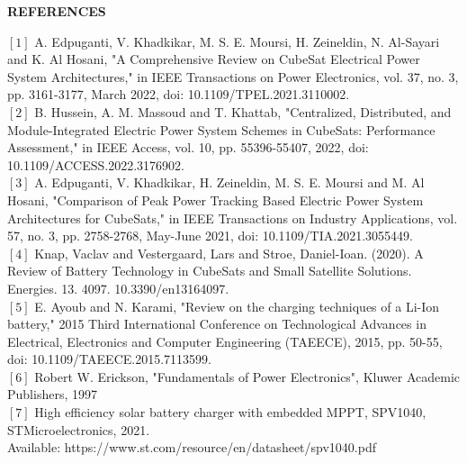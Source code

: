 \thispagestyle{plain}

\begin{center}
	\Large {\bf \uppercase{References}}
\end{center}

\vspace{1\baselineskip}
\noindent
\setlength\parindent{0pt}
$[1]$ A. Edpuganti, V. Khadkikar, M. S. E. Moursi, H. Zeineldin, N. Al-Sayari and K. Al Hosani, "A Comprehensive Review on CubeSat Electrical Power System Architectures," in IEEE Transactions on Power Electronics, vol. 37, no. 3, pp. 3161-3177, March 2022, doi: 10.1109/TPEL.2021.3110002.
\vspace{3.5pt}
\\ 
$[2]$ B. Hussein, A. M. Massoud and T. Khattab, "Centralized, Distributed, and Module-Integrated Electric Power System Schemes in CubeSats: Performance Assessment," in IEEE Access, vol. 10, pp. 55396-55407, 2022, doi: 10.1109/ACCESS.2022.3176902.
\vspace{3.5pt}
\\ 
$[3]$ A. Edpuganti, V. Khadkikar, H. Zeineldin, M. S. E. Moursi and M. Al Hosani, "Comparison of Peak Power Tracking Based Electric Power System Architectures for CubeSats," in IEEE Transactions on Industry Applications, vol. 57, no. 3, pp. 2758-2768, May-June 2021, doi: 10.1109/TIA.2021.3055449.
\vspace{3.5pt}
\\
$[4]$ Knap, Vaclav and Vestergaard, Lars and Stroe, Daniel-Ioan. (2020). A Review of Battery Technology in CubeSats and Small Satellite Solutions. Energies. 13. 4097. 10.3390/en13164097.
 \vspace{3.5pt}
 \\ 
$[5]$ E. Ayoub and N. Karami, "Review on the charging techniques of a Li-Ion battery," 2015 Third International Conference on Technological Advances in Electrical, Electronics and Computer Engineering (TAEECE), 2015, pp. 50-55, doi: 10.1109/TAEECE.2015.7113599.
\vspace{3.5pt}
\\ 
$[6]$ Robert W. Erickson, "Fundamentals of Power Electronics", Kluwer Academic Publishers, 1997
\vspace{3.5pt}
\\ 
$[7]$ High efficiency solar battery charger with embedded MPPT, SPV1040, STMicroelectronics, 2021.\\Available: https://www.st.com/resource/en/datasheet/spv1040.pdf\vspace{3.5pt}
